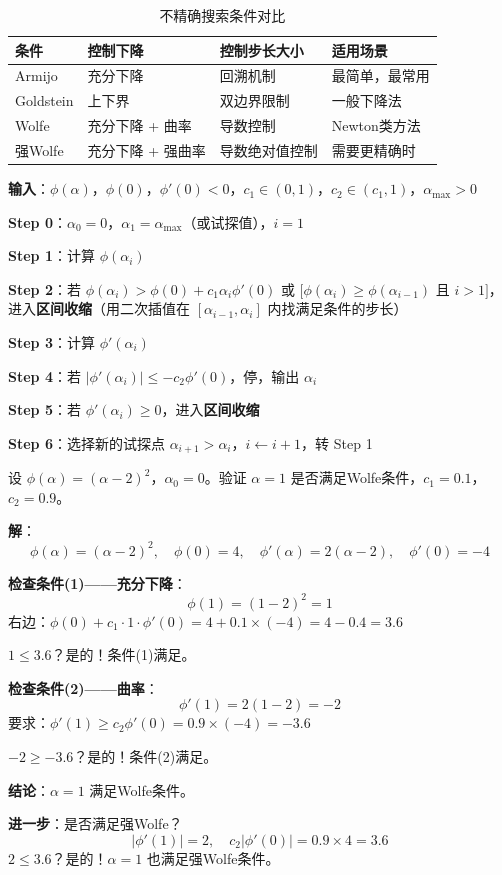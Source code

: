 \begin{table}[htbp]
\centering
\caption{不精确搜索条件对比}
\begin{tabular}{@{}llll@{}}
\toprule
\textbf{条件} & \textbf{控制下降} & \textbf{控制步长大小} & \textbf{适用场景} \\
\midrule
Armijo & 充分下降 & 回溯机制 & 最简单，最常用 \\
Goldstein & 上下界 & 双边界限制 & 一般下降法 \\
Wolfe & 充分下降 + 曲率 & 导数控制 & Newton类方法 \\
强Wolfe & 充分下降 + 强曲率 & 导数绝对值控制 & 需要更精确时 \\
\bottomrule
\end{tabular}
\end{table}

\begin{algobox}[Wolfe条件线搜索算法]
\textbf{输入}：$\phi(\alpha)$，$\phi(0)$，$\phi'(0) < 0$，$c_1 \in (0,1)$，$c_2 \in (c_1, 1)$，$\alpha_{\max} > 0$

\textbf{Step 0}：$\alpha_0 = 0$，$\alpha_1 = \alpha_{\max}$（或试探值），$i = 1$

\textbf{Step 1}：计算 $\phi(\alpha_i)$

\textbf{Step 2}：若 $\phi(\alpha_i) > \phi(0) + c_1 \alpha_i \phi'(0)$ 或 $[\phi(\alpha_i) \geq \phi(\alpha_{i-1})$ 且 $i > 1]$，
进入\textbf{区间收缩}（用二次插值在 $[\alpha_{i-1}, \alpha_i]$ 内找满足条件的步长）

\textbf{Step 3}：计算 $\phi'(\alpha_i)$

\textbf{Step 4}：若 $|\phi'(\alpha_i)| \leq -c_2 \phi'(0)$，停，输出 $\alpha_i$

\textbf{Step 5}：若 $\phi'(\alpha_i) \geq 0$，进入\textbf{区间收缩}

\textbf{Step 6}：选择新的试探点 $\alpha_{i+1} > \alpha_i$，$i \leftarrow i+1$，转 Step 1
\end{algobox}

\begin{example}[Wolfe条件验证]\label{ex:wolfe}
设 $\phi(\alpha) = (\alpha - 2)^2$，$\alpha_0 = 0$。验证 $\alpha = 1$ 是否满足Wolfe条件，$c_1 = 0.1$，$c_2 = 0.9$。

\textbf{解}：
\[
\phi(\alpha) = (\alpha - 2)^2,\quad \phi(0) = 4,\quad \phi'(\alpha) = 2(\alpha - 2),\quad \phi'(0) = -4
\]

\textbf{检查条件(1)——充分下降}：
\[
\phi(1) = (1-2)^2 = 1
\]
右边：$\phi(0) + c_1 \cdot 1 \cdot \phi'(0) = 4 + 0.1 \times (-4) = 4 - 0.4 = 3.6$

$1 \leq 3.6$？是的！条件(1)满足。

\textbf{检查条件(2)——曲率}：
\[
\phi'(1) = 2(1-2) = -2
\]
要求：$\phi'(1) \geq c_2 \phi'(0) = 0.9 \times (-4) = -3.6$

$-2 \geq -3.6$？是的！条件(2)满足。

\textbf{结论}：$\alpha = 1$ 满足Wolfe条件。

\textbf{进一步}：是否满足强Wolfe？
\[
|\phi'(1)| = 2,\quad c_2 |\phi'(0)| = 0.9 \times 4 = 3.6
\]
$2 \leq 3.6$？是的！$\alpha = 1$ 也满足强Wolfe条件。
\end{example}

